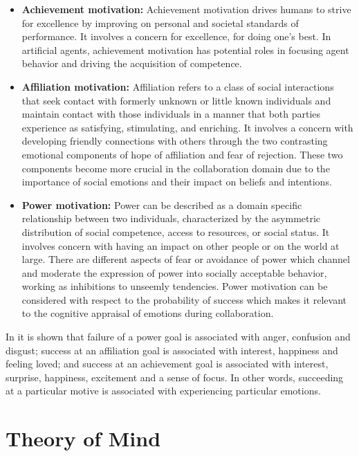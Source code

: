 \documentclass[12pt]{report}
\begin{document}
\begin{itemize}
  \item \textbf{Achievement motivation:}
  Achievement motivation drives humans to strive for excellence by improving on
  personal and societal standards of performance. It involves a concern for
  excellence, for doing one's best. In artificial agents, achievement
  motivation has potential roles in focusing agent behavior and driving the
  acquisition of competence.
  
  \item \textbf{Affiliation motivation:}
  Affiliation refers to a class of social interactions that seek contact with
  formerly unknown or little known individuals and maintain contact with those
  individuals in a manner that both parties experience as satisfying,
  stimulating, and enriching. It involves a concern with developing friendly
  connections with others through the two contrasting emotional components of
  hope of affiliation and fear of rejection. These two components become more
  crucial in the collaboration domain due to the importance of social emotions
  and their impact on beliefs and intentions.
  
  \item \textbf{Power motivation:}
  Power can be described as a domain specific relationship between two
  individuals, characterized by the asymmetric distribution of social
  competence, access to resources, or social status. It involves concern with
  having an impact on other people or on the world at large. There are different
  aspects of fear or avoidance of power which channel and moderate the
  expression of power into socially acceptable behavior, working as inhibitions
  to unseemly tendencies. Power motivation can be considered with respect to the
  probability of success which makes it relevant to the cognitive appraisal of
  emotions during collaboration.
\end{itemize}

In \cite{zurbriggen:linking-motives-emotions} it is shown that failure of a
power goal is associated with anger, confusion and disgust; success at an
affiliation goal is associated with interest, happiness and feeling loved; and
success at an achievement goal is associated with interest, surprise, happiness,
excitement and a sense of focus. In other words, succeeding at a particular
motive is associated with experiencing particular emotions.

\section{Theory of Mind}
\label{section-tom-bg}
\end{document}
